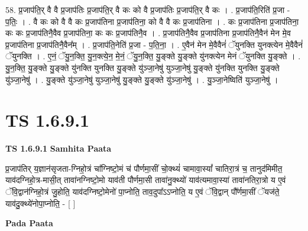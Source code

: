 \documentclass[17pt]{extarticle}
\begin{document}
58. प्र॒जाप॑ति॒र् वै वै प्र॒जाप॑तिः प्र॒जाप॑ति॒र् वै कः को वै प्र॒जाप॑तिः प्र॒जाप॑ति॒र् वै कः । . प्र॒जाप॑ति॒रिति॑ प्र॒जा - प॒तिः॒ । . वै कः को वै वै कः प्र॒जाप॑तिना प्र॒जाप॑तिना॒ को वै वै कः प्र॒जाप॑तिना । . कः प्र॒जाप॑तिना प्र॒जाप॑तिना॒ कः कः प्र॒जाप॑तिनै॒वैव प्र॒जाप॑तिना॒ कः कः प्र॒जाप॑तिनै॒व । . प्र॒जाप॑तिनै॒वैव प्र॒जाप॑तिना प्र॒जाप॑तिनै॒वैन॑ मेन मे॒व प्र॒जाप॑तिना प्र॒जाप॑तिनै॒वैन᳚म् । . प्र॒जाप॑ति॒नेति॑ प्र॒जा - प॒ति॒ना॒ । . ए॒वैन॑ मेन मे॒वैवैनं॑ ॅयुनक्ति युनक्त्येन मे॒वैवैनं॑ ॅयुनक्ति । . ए॒नं॒ ॅयु॒न॒क्ति॒ यु॒न॒क्त्ये॒न॒ मे॒नं॒ ॅयु॒न॒क्ति॒ यु॒ङ्क्ते यु॒ङ्क्ते यु॑नक्त्येन मेनं ॅयुनक्ति यु॒ङ्क्ते । . यु॒न॒क्ति॒ यु॒ङ्क्ते यु॒ङ्क्ते यु॑नक्ति युनक्ति यु॒ङ्क्ते यु॑ञ्जा॒नेषु॑ युञ्जा॒नेषु॑ यु॒ङ्क्ते यु॑नक्ति युनक्ति यु॒ङ्क्ते यु॑ञ्जा॒नेषु॑ । . यु॒ङ्क्ते यु॑ञ्जा॒नेषु॑ युञ्जा॒नेषु॑ यु॒ङ्क्ते यु॒ङ्क्ते यु॑ञ्जा॒नेषु॑ । . यु॒ञ्जा॒नेष्विति॑ युञ्जा॒नेषु॑ । \newline
\pagebreak
{}

\section{ TS 1.6.9.1 }

\textbf{TS 1.6.9.1 } \newline
\textbf{Samhita Paata} \newline

प्र॒जाप॑तिर् य॒ज्ञान॑सृजता-ग्निहो॒त्रं चा᳚ग्निष्टो॒मं च॑ पौर्णमा॒सीं चो॒क्थ्यं॑ चामावा॒स्यां᳚ चातिरा॒त्रं च॒ तानुद॑मिमीत॒ याव॑दग्निहो॒त्र-मासी॒त् तावा॑नग्निष्टो॒मो याव॑ती पौर्णमा॒सी तावा॑नु॒क्थ्यो॑ याव॑त्यमावा॒स्या॑ तावा॑नतिरा॒त्रो य ए॒वं ॅवि॒द्वान॑ग्निहो॒त्रं जु॒होति॒ याव॑दग्निष्टो॒मेनो॑ पा॒प्नोति॒ ताव॒दुपा᳚ऽऽप्नोति॒ य ए॒वं ॅवि॒द्वान् पौ᳚र्णमा॒सीं ॅयज॑ते॒ याव॑दु॒क्थ्ये॑नोपा॒प्नोति॒ - [ ] \newline

\textbf{Pada Paata} \newline
\end{document}
